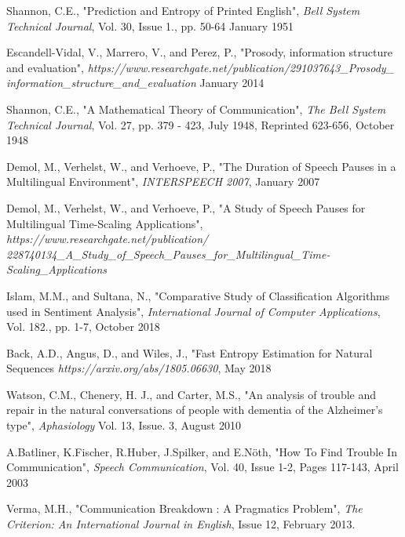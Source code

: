 \begin{thebibliography}{100} %
    
     Shannon, C.E.,
    			"Prediction and Entropy of Printed English",
			\emph{Bell System Technical Journal}, Vol. 30, Issue 1., pp. 50-64
			January 1951
    
    Escandell-Vidal, V., Marrero, V., and Perez, P.,
    			"Prosody, information structure and evaluation",
			\emph{https://www.researchgate.net/publication/291037643\_Prosody\_ \\
			information\_structure\_and\_evaluation} January 2014

     Shannon, C.E.,
    			"A Mathematical Theory of Communication",
			\emph{The Bell System Technical Journal},
			Vol. 27, pp. 379 - 423, July 1948,
			Reprinted 623-656, October 1948

    
     Demol, M., Verhelst, W., and Verhoeve, P.,     
    			"The Duration of Speech Pauses in a Multilingual Environment",
			\emph{INTERSPEECH 2007}, 
			January 2007
    
     Demol, M., Verhelst, W., and Verhoeve, P.,
    			"A Study of Speech Pauses for Multilingual Time-Scaling Applications", 
			\emph{https://www.researchgate.net/publication/
			228740134\_A\_Study\_of\_Speech\_Pauses\_for\_Multilingual\_Time-Scaling\_Applications}

    
    	Islam, M.M., and Sultana, N.,
    			"Comparative Study of Classification Algorithms used in Sentiment Analysis",
			\emph{International Journal of Computer Applications},
			Vol. 182., pp. 1-7, October 2018

    
    Back, A.D., Angus, D., and Wiles, J., "Fast Entropy Estimation for Natural Sequences
    			\emph{https://arxiv.org/abs/1805.06630}, May 2018
    
    
     Watson, C.M., Chenery, H. J., and Carter, M.S.,
    			"An analysis of trouble and repair in the natural conversations of people with dementia of the Alzheimer’s type",
			\emph{Aphasiology} Vol. 13, Issue. 3, August 2010

    
     A.Batliner, K.Fischer, R.Huber, J.Spilker, and E.Nöth,
    			"How To Find Trouble In Communication",
			\emph{Speech Communication},
			Vol. 40, Issue 1-2, Pages 117-143, April 2003 
			 
    
     Verma, M.H., 
    			"Communication Breakdown : A Pragmatics Problem",
			\emph{The Criterion: An International Journal in English},
			Issue 12, February 2013.


\end{thebibliography}
